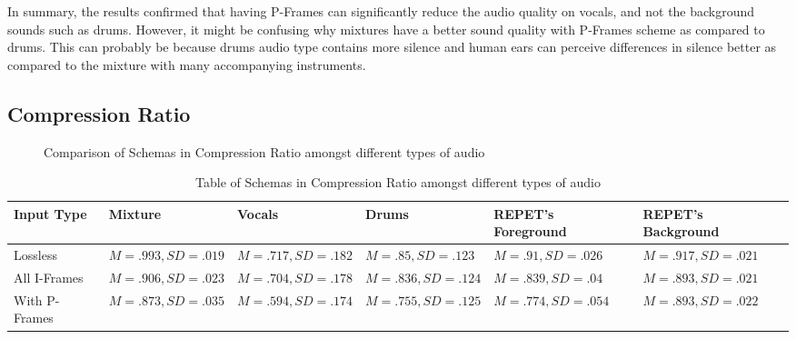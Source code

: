 In summary, the results confirmed that having P-Frames can significantly reduce the audio quality on vocals, and not the background sounds such as drums. However, it might be confusing why mixtures have a better sound quality with P-Frames scheme as compared to drums. This can probably be because drums audio type contains more silence and human ears can perceive differences in silence better as compared to the mixture with many accompanying instruments.

\subsection{Compression Ratio}

\begin{figure}[ht]
  
  \caption{Comparison of Schemas in Compression Ratio amongst different types of audio}
  \label{fig:input-compression}
\end{figure}

\begin{table}[ht]
\centering
\begin{tabularx}{\linewidth}{|X|X|X|X|X|}
\hline
Input Type & Mixture & Vocals & Drums & REPET's Foreground & REPET's Background \\
\hline
Lossless & $M=.993, SD=.019$ & $M=.717, SD=.182$ & $M=.85, SD=.123$ & $M=.91, SD=.026$ & $M=.917, SD=.021$ \\
\hline
All I-Frames & $M=.906, SD=.023$ & $M=.704, SD=.178$ & $M=.836, SD=.124$ & $M=.839, SD=.04$ & $M=.893, SD=.021$ \\
\hline
With P-Frames & $M=.873, SD=.035$ & $M=.594, SD=.174$ & $M=.755, SD=.125$ & $M=.774, SD=.054$ & $M=.893, SD=.022$ \\
\hline
\end{tabularx}
\caption{Table of Schemas in Compression Ratio amongst different types of audio}
\label{tab:input-compression}
\end{table}

